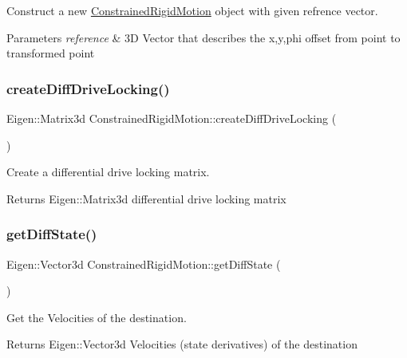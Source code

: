 Construct a new \hyperlink{classConstrainedRigidMotion}{Constrained\+Rigid\+Motion} object with given refrence vector. 


\begin{DoxyParams}{Parameters}
{\em reference} & 3D Vector that describes the x,y,phi offset from point to transformed point \\
\hline
\end{DoxyParams}
\mbox{\label{group__RigidMotion_gad4fb6e13815454559ec7e52b291489af}} 
\subsubsection{\texorpdfstring{create\+Diff\+Drive\+Locking()}{createDiffDriveLocking()}}
{\footnotesize\ttfamily Eigen\+::\+Matrix3d Constrained\+Rigid\+Motion\+::create\+Diff\+Drive\+Locking (\begin{DoxyParamCaption}{ }\end{DoxyParamCaption})\hspace{0.3cm}{\ttfamily [static]}}



Create a differential drive locking matrix. 

\begin{DoxyReturn}{Returns}
Eigen\+::\+Matrix3d differential drive locking matrix 
\end{DoxyReturn}
\mbox{\label{group__RigidMotion_ga59bdced4bb2e565bc39312e5328507ef}} 
\subsubsection{\texorpdfstring{get\+Diff\+State()}{getDiffState()}}
{\footnotesize\ttfamily Eigen\+::\+Vector3d Constrained\+Rigid\+Motion\+::get\+Diff\+State (\begin{DoxyParamCaption}{ }\end{DoxyParamCaption})}



Get the Velocities of the destination. 

\begin{DoxyReturn}{Returns}
Eigen\+::\+Vector3d Velocities (state derivatives) of the destination 
\end{DoxyReturn}
\mbox{\label{group__RigidMotion_gabde902d2f91035cd5054a33dab4acc48}} 

